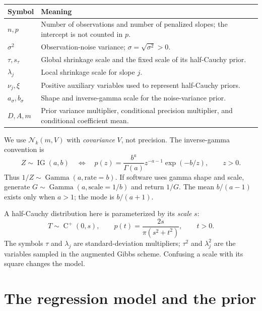 \documentclass[11pt,letterpaper]{article}
\numberwithin{equation}{section}
\newcommand{\IG}{\operatorname{IG}}
\newcommand{\Ga}{\operatorname{Gamma}}
\newcommand{\HC}{\operatorname{C}^{+}}
\newcommand{\Normal}{\mathcal{N}}
\begin{document}
\begin{center}
\begin{tabular}{@{}p{}p{}@{}}
\toprule
Symbol & Meaning \\
\midrule
\(n,p\) & Number of observations and number of penalized slopes; the intercept is not counted in \(p\). \\
\(\sigma^2\) & Observation-noise variance; \(\sigma=\sqrt{\sigma^2}>0\). \\
\(\tau,s_\tau\) & Global shrinkage scale and the fixed scale of its half-Cauchy prior. \\
\(\lambda_j\) & Local shrinkage scale for slope \(j\). \\
\(\nu_j,\xi\) & Positive auxiliary variables used to represent half-Cauchy priors. \\
\(a_\sigma,b_\sigma\) & Shape and inverse-gamma scale for the noise-variance prior. \\
\(D,A,m\) & Prior variance multiplier, conditional precision multiplier, and conditional coefficient mean. \\
\bottomrule
\end{tabular}
\end{center}

We use \(\Normal_k(m,V)\) with \emph{covariance} \(V\), not precision. The
inverse-gamma convention is
\begin{equation}\label{eq:ig}
 Z\sim\IG(a,b)
 \quad\Longleftrightarrow\quad
 p(z)=\frac{b^a}{\Gamma(a)}z^{-a-1}\exp(-b/z),\qquad z>0.
\end{equation}
Thus \(1/Z\sim\Ga(a,\text{rate}=b)\). If software uses gamma shape and scale,
generate \(G\sim\Ga(a,\text{scale}=1/b)\) and return \(1/G\).
The mean \(b/(a-1)\) exists only when \(a>1\); the mode is \(b/(a+1)\).

A half-Cauchy distribution here is parameterized by its \emph{scale} \(s\):
\begin{equation}\label{eq:hc}
 T\sim\HC(0,s),\qquad
 p(t)=\frac{2s}{\pi(s^2+t^2)},\qquad t>0.
\end{equation}
The symbols \(\tau\) and \(\lambda_j\) are standard-deviation multipliers;
\(\tau^2\) and \(\lambda_j^2\) are the variables sampled in the augmented Gibbs
scheme. Confusing a scale with its square changes the model.

\section{The regression model and the prior}\label{sec:model}
\end{document}
